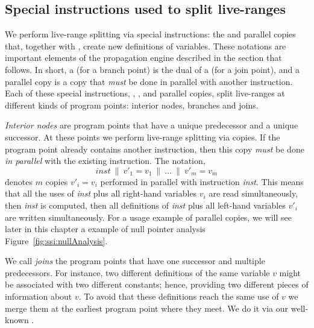 {\subsection{Special instructions used to split live-ranges}
\label{sub:ssi:split}

We perform live-range splitting via special instructions: the \sigmafuns and parallel copies that, together with \phifuns, create new definitions of variables.
These notations are important elements of the propagation engine described in the section that follows.
In short, a \sigmafun\index{\sigmafun} (for a branch point) is the dual of 
a \phifun (for a join point), and a parallel copy is 
a copy that \emph{must} be done in parallel with another instruction.
Each of these special instructions, \phifun, \sigmafuns, and parallel copies, 
split live-ranges at different kinds of program points: interior nodes, 
branches and joins.

\emph{Interior nodes} are program points that have 
a unique predecessor and a unique successor.
At these points we perform live-range splitting via copies.
If the program point already contains another instruction, then this copy 
\emph{must} be done \emph{in parallel} with the existing instruction.
The notation, 
\[\textit{inst} \ \parallel\  v'_1=v_1 \ \parallel\  \dots \ \parallel\  
v'_m=v_m\]
denotes $m$ copies $v'_i=v_i$ performed in parallel with
instruction \textit{inst}.
This means that all the uses of \textit{inst} plus all right-hand variables 
$v_i$ are read simultaneously, then \textit{inst} is computed, then all 
definitions of \textit{inst} plus all left-hand variables $v'_i$ are written 
simultaneously.
For a usage example of parallel copies, we will see later in this chapter 
a example of null pointer analysis Figure~\ref{fig:ssi:nullAnalysis}.


We call {\em joins} the program points that have one successor and multiple predecessors.
For instance, two different definitions of the same variable $v$ might be associated with two different constants; hence, providing two different pieces of information about $v$.
To avoid that these definitions reach the same use of $v$ we merge them at the earliest program point where they meet.
We do it via our well-known \phifuns.

}
